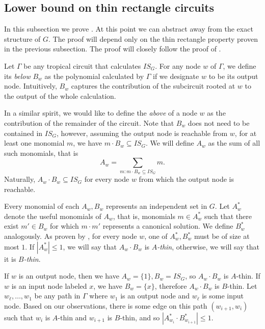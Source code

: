 \subsection{Lower bound on thin rectangle circuits}
In this subsection we prove . At this point we can abstract away from the exact structure of $G$. The proof will depend only on the thin rectangle property proven in the previous subsection. The proof will closely follow the proof of \cite[Lemma 2.18]{Jukna2023}.

Let $\Gamma$ be any tropical circuit that calculates $IS_G$. For any node $w$ of $\Gamma$, we define its \emph{below} $B_w$ as the polynomial calculated by $\Gamma$ if we designate $w$ to be its output node. Intuitively, $B_w$ captures the contribution of the subcircuit rooted at $w$ to the output of the whole calculation.

In a similar spirit, we would like to define the \emph{above} of a node $w$ as the contribution of the remainder of the circuit. Note that $B_w$ does not need to be contained in $IS_G$, however, assuming the output node is reachable from $w$, for at least one monomial $m$, we have $m \cdot B_w \subseteq IS_G$. We will define $A_w$ as the sum of all such monomials, that is
$$
    A_w = \sum_{m:m \cdot B_w \subseteq IS_G} m.
$$
Naturally, $A_w \cdot B_w \subseteq IS_G$ for every node $w$ from which the output node is reachable.

Every monomial of each $A_w, B_w$ represents an independent set in $G$. Let $A_w^*$ denote the useful monomials of $A_w$, that is, monomials $m \in A_w^*$ such that there exist $m' \in B_w$ for which $m \cdot m'$ represents a canonical solution. We define $B_w^*$ analogously. As proven by , for every node $w$, one of $A_w^*, B_w^*$ must be of size at most $1$. If $|A_w^*| \leq 1$, we will say that $A_w \cdot B_w$ is \emph{$A$-thin}, otherwise, we will say that it is \emph{$B$-thin}.

If $w$ is an output node, then we have $A_w = \{1\}, B_w = IS_G$, so $A_w \cdot B_w$ is $A$-thin. If $w$ is an input node labeled $x$, we have $B_w = \{x\}$, therefore $A_w \cdot B_w$ is $B$-thin. Let $w_\ell, \dots, w_1$ be any path in $\Gamma$ where $w_1$ is an output node and $w_\ell$ is some input node. Based on our observations, there is some edge on this path $(w_{i+1}, w_i)$ such that $w_i$ is $A$-thin and $w_{i + 1}$ is $B$-thin, and so $|A_{w_i}^* \cdot B_{w_{i+1}}^*| \leq 1$.

